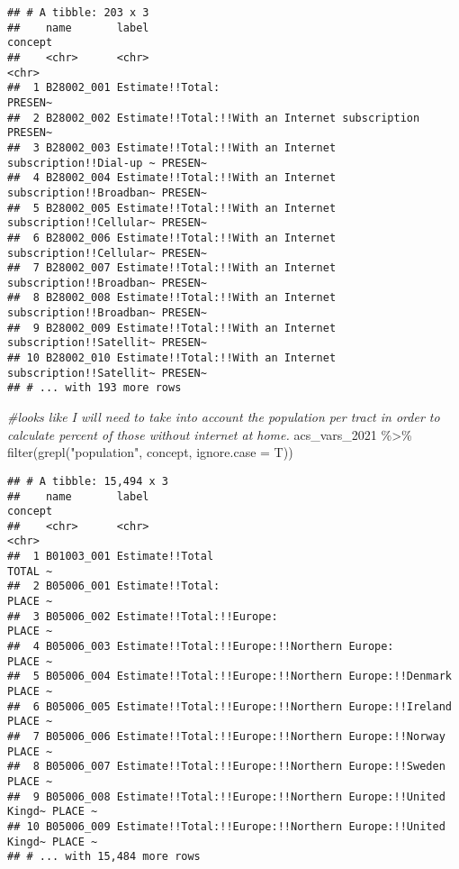\documentclass[
]{article}
\newenvironment{Shaded}{\begin{snugshade}}{\end{snugshade}}
\newcommand{\AttributeTok}[1]{\textcolor[rgb]{0.77,0.63,0.00}{#1}}
\newcommand{\CommentTok}[1]{\textcolor[rgb]{0.56,0.35,0.01}{\textit{#1}}}
\newcommand{\FunctionTok}[1]{\textcolor[rgb]{0.00,0.00,0.00}{#1}}
\newcommand{\NormalTok}[1]{#1}
\newcommand{\SpecialCharTok}[1]{\textcolor[rgb]{0.00,0.00,0.00}{#1}}
\newcommand{\StringTok}[1]{\textcolor[rgb]{0.31,0.60,0.02}{#1}}
\begin{document}
\begin{verbatim}
## # A tibble: 203 x 3
##    name       label                                                      concept
##    <chr>      <chr>                                                      <chr>  
##  1 B28002_001 Estimate!!Total:                                           PRESEN~
##  2 B28002_002 Estimate!!Total:!!With an Internet subscription            PRESEN~
##  3 B28002_003 Estimate!!Total:!!With an Internet subscription!!Dial-up ~ PRESEN~
##  4 B28002_004 Estimate!!Total:!!With an Internet subscription!!Broadban~ PRESEN~
##  5 B28002_005 Estimate!!Total:!!With an Internet subscription!!Cellular~ PRESEN~
##  6 B28002_006 Estimate!!Total:!!With an Internet subscription!!Cellular~ PRESEN~
##  7 B28002_007 Estimate!!Total:!!With an Internet subscription!!Broadban~ PRESEN~
##  8 B28002_008 Estimate!!Total:!!With an Internet subscription!!Broadban~ PRESEN~
##  9 B28002_009 Estimate!!Total:!!With an Internet subscription!!Satellit~ PRESEN~
## 10 B28002_010 Estimate!!Total:!!With an Internet subscription!!Satellit~ PRESEN~
## # ... with 193 more rows
\end{verbatim}

\begin{Shaded}
\begin{Highlighting}[]
\CommentTok{\#looks like I will need to take into account the population per tract in order to calculate percent of those without internet at home. }
\NormalTok{acs\_vars\_2021 }\SpecialCharTok{\%\textgreater{}\%} \FunctionTok{filter}\NormalTok{(}\FunctionTok{grepl}\NormalTok{(}\StringTok{"population"}\NormalTok{, concept, }\AttributeTok{ignore.case =}\NormalTok{ T))}
\end{Highlighting}
\end{Shaded}

\begin{verbatim}
## # A tibble: 15,494 x 3
##    name       label                                                      concept
##    <chr>      <chr>                                                      <chr>  
##  1 B01003_001 Estimate!!Total                                            TOTAL ~
##  2 B05006_001 Estimate!!Total:                                           PLACE ~
##  3 B05006_002 Estimate!!Total:!!Europe:                                  PLACE ~
##  4 B05006_003 Estimate!!Total:!!Europe:!!Northern Europe:                PLACE ~
##  5 B05006_004 Estimate!!Total:!!Europe:!!Northern Europe:!!Denmark       PLACE ~
##  6 B05006_005 Estimate!!Total:!!Europe:!!Northern Europe:!!Ireland       PLACE ~
##  7 B05006_006 Estimate!!Total:!!Europe:!!Northern Europe:!!Norway        PLACE ~
##  8 B05006_007 Estimate!!Total:!!Europe:!!Northern Europe:!!Sweden        PLACE ~
##  9 B05006_008 Estimate!!Total:!!Europe:!!Northern Europe:!!United Kingd~ PLACE ~
## 10 B05006_009 Estimate!!Total:!!Europe:!!Northern Europe:!!United Kingd~ PLACE ~
## # ... with 15,484 more rows
\end{verbatim}
\end{document}
